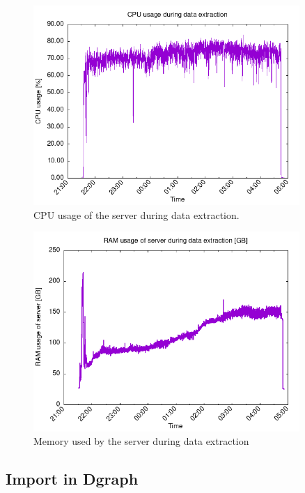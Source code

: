 \begin{figure}[H]
    \centering
    \includegraphics[width=0.9\textwidth]{Figures/results/cpu-usage-extraction.png}
    \caption{CPU usage of the server during data extraction.}
    \label{fig:cpu-usage-extraction}
\end{figure}

\begin{figure}[H]
    \centering
    \includegraphics[width=0.9\textwidth]{Figures/results/ram-usage-extraction.png}
    \caption{Memory used by the server during data extraction}
    \label{fig:ram-usage-extraction}
\end{figure}

\subsection{Import in Dgraph}

